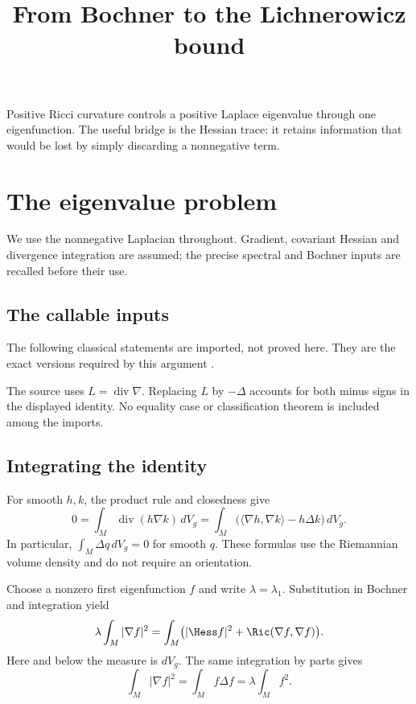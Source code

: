 \documentclass[12pt,reqno]{amsart}
\title{From Bochner to the Lichnerowicz bound}
\date{}
\begin{document}
\maketitle

Positive Ricci curvature controls a positive Laplace eigenvalue through
one eigenfunction. The useful bridge is the Hessian trace: it retains
information that would be lost by simply discarding a nonnegative term.

\section{The eigenvalue problem}
We use the nonnegative Laplacian throughout. Gradient, covariant Hessian
and divergence integration are assumed; the precise spectral and
Bochner inputs are recalled before their use.

\begin{theorem}[Lichnerowicz]\label{thm:lich}

\end{theorem}

\subsection*{The callable inputs}
The following classical statements are imported, not proved here.
They are the exact versions required by this argument
\cite[Sections 29.1--29.2]{S-Datar}.

\begin{proposition}\label{prop:inputs}

\end{proposition}

The source uses $L=\operatorname{div}\nabla$. Replacing $L$ by $-\Delta$
accounts for both minus signs in the displayed identity. No equality
case or classification theorem is included among the imports.

\subsection*{Integrating the identity}
For smooth $h,k$, the product rule and closedness give
\[
 0=\int_M\operatorname{div}(h\nabla k)\,dV_g
  =\int_M\bigl(\langle\nabla h,\nabla k\rangle-h\Delta k\bigr)\,dV_g.
\]
In particular, $\int_M\Delta q\,dV_g=0$ for smooth $q$. These formulas
use the Riemannian volume density and do not require an orientation.

Choose a nonzero first eigenfunction $f$ and write $\lambda=\lambda_1$.
Substitution in Bochner and integration yield
\begin{equation}\label{eq:bochner-int}
 \lambda\int_M|\nabla f|^2
 =\int_M\bigl(|\Hess f|^2+\Ric(\nabla f,\nabla f)\bigr).
\end{equation}
Here and below the measure is $dV_g$. The same integration by parts gives
\begin{equation}\label{eq:energy}
 \int_M|\nabla f|^2=\int_M f\Delta f
                    =\lambda\int_M f^2.
\end{equation}
\end{document}
